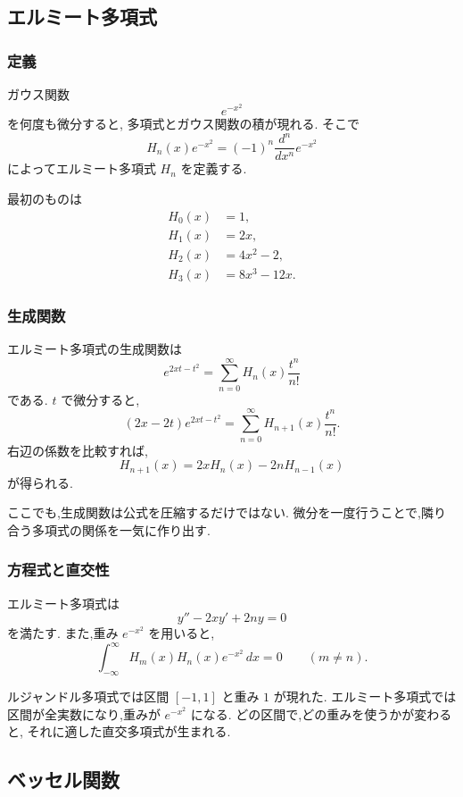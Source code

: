 \subsection{エルミート多項式}

\subsubsection{定義}

ガウス関数
\[
  e^{-x^2}
\]
を何度も微分すると,
多項式とガウス関数の積が現れる.
そこで
\[
  H_n(x)e^{-x^2}
  =(-1)^n\frac{d^n}{dx^n}e^{-x^2}
\]
によってエルミート多項式 $H_n$ を定義する.

最初のものは
\[
\begin{aligned}
  H_0(x)&=1,\\
  H_1(x)&=2x,\\
  H_2(x)&=4x^2-2,\\
  H_3(x)&=8x^3-12x.
\end{aligned}
\]

\subsubsection{生成関数}

エルミート多項式の生成関数は
\[
  e^{2xt-t^2}
  =\sum_{n=0}^{\infty}H_n(x)\frac{t^n}{n!}
\]
である.
$t$ で微分すると,
\[
  (2x-2t)e^{2xt-t^2}
  =\sum_{n=0}^{\infty}H_{n+1}(x)\frac{t^n}{n!}.
\]
右辺の係数を比較すれば,
\[
  H_{n+1}(x)=2xH_n(x)-2nH_{n-1}(x)
\]
が得られる.

ここでも,生成関数は公式を圧縮するだけではない.
微分を一度行うことで,隣り合う多項式の関係を一気に作り出す.

\subsubsection{方程式と直交性}

エルミート多項式は
\[
  y''-2xy'+2ny=0
\]
を満たす.
また,重み $e^{-x^2}$ を用いると,
\[
  \int_{-\infty}^{\infty}
  H_m(x)H_n(x)e^{-x^2}\,dx=0
  \qquad(m\neq n).
\]

ルジャンドル多項式では区間 $[-1,1]$ と重み $1$ が現れた.
エルミート多項式では区間が全実数になり,重みが $e^{-x^2}$ になる.
どの区間で,どの重みを使うかが変わると,
それに適した直交多項式が生まれる.

\subsection{ベッセル関数}

